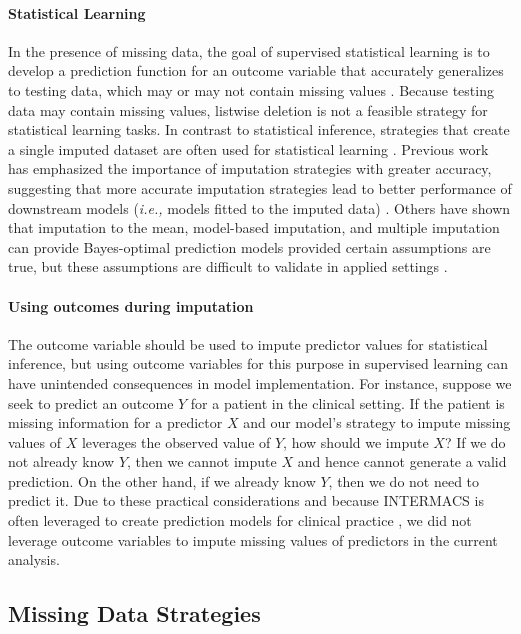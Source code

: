\documentclass{article}
\begin{document}
\paragraph{Statistical Learning}

In the presence of missing data, the goal of supervised statistical
learning is to develop a prediction function for an outcome variable
that accurately generalizes to testing data, which may or may not
contain missing values \cite{hastie2009elements}. Because testing data
may contain missing values, listwise deletion is not a feasible strategy
for statistical learning tasks. In contrast to statistical inference,
strategies that create a single imputed dataset are often used for
statistical learning \cite{kuhn2019feature}. Previous work has
emphasized the importance of imputation strategies with greater
accuracy, suggesting that more accurate imputation strategies lead to
better performance of downstream models (\textit{i.e., }models fitted to
the imputed data) \cite{jerez2010missing}. Others have shown that
imputation to the mean, model-based imputation, and multiple imputation
can provide Bayes-optimal prediction models provided certain assumptions
are true, but these assumptions are difficult to validate in applied
settings \cite{josse2019consistency}.

\paragraph{Using outcomes during imputation}

The outcome variable should be used to impute predictor values for
statistical inference, but using outcome variables for this purpose in
supervised learning can have unintended consequences in model
implementation. For instance, suppose we seek to predict an outcome
\(Y\) for a patient in the clinical setting. If the patient is missing
information for a predictor \(X\) and our model's strategy to impute
missing values of \(X\) leverages the observed value of \(Y\), how
should we impute \(X\)? If we do not already know \(Y\), then we cannot
impute \(X\) and hence cannot generate a valid prediction. On the other
hand, if we already know \(Y\), then we do not need to predict it. Due
to these practical considerations and because INTERMACS is often
leveraged to create prediction models for clinical practice
\cite{thomas2014pre}, we did not leverage outcome variables to impute
missing values of predictors in the current analysis.

\hypertarget{missing-data-strategies}{%
\subsection{Missing Data Strategies}\label{missing-data-strategies}}
\end{document}
